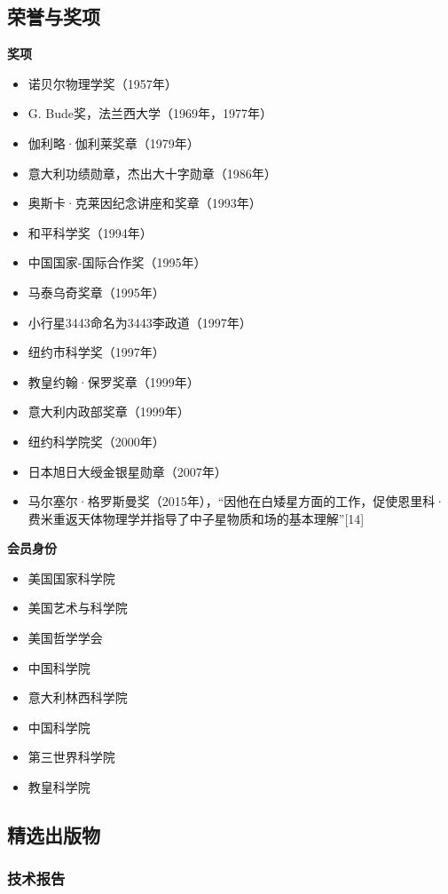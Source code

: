\subsection{荣誉与奖项}
\textbf{奖项}  
\begin{itemize}
\item 诺贝尔物理学奖（1957年）  
\item G. Bude奖，法兰西大学（1969年，1977年）  
\item 伽利略·伽利莱奖章（1979年）  
\item 意大利功绩勋章，杰出大十字勋章（1986年）  
\item 奥斯卡·克莱因纪念讲座和奖章（1993年）  
\item 和平科学奖（1994年）  
\item 中国国家-国际合作奖（1995年）  
\item 马泰乌奇奖章（1995年）  
\item 小行星3443命名为3443李政道（1997年）  
\item 纽约市科学奖（1997年）  
\item 教皇约翰·保罗奖章（1999年）  
\item 意大利内政部奖章（1999年）  
\item 纽约科学院奖（2000年）  
\item 日本旭日大绶金银星勋章（2007年）  
\item 马尔塞尔·格罗斯曼奖（2015年），“因他在白矮星方面的工作，促使恩里科·费米重返天体物理学并指导了中子星物质和场的基本理解”[14]
\end{itemize}
\textbf{会员身份}  
\begin{itemize}
\item 美国国家科学院  
\item 美国艺术与科学院  
\item 美国哲学学会  
\item 中国科学院  
\item 意大利林西科学院  
\item 中国科学院  
\item 第三世界科学院  
\item 教皇科学院
\end{itemize}
\subsection{精选出版物}  
\subsubsection{技术报告}